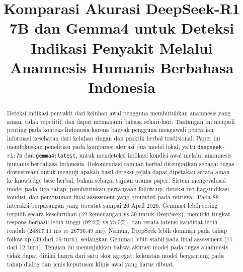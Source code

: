 \documentclass[conference]{IEEEtran}
\begin{document}
\title{Komparasi Akurasi DeepSeek-R1 7B dan Gemma4 untuk Deteksi Indikasi Penyakit Melalui Anamnesis Humanis Berbahasa Indonesia}

\author{
\and
{}
}

\maketitle

\begin{abstract}
Deteksi indikasi penyakit dari keluhan awal pengguna membutuhkan anamnesis yang aman, tidak repetitif, dan dapat memahami bahasa sehari-hari. Tantangan ini menjadi penting pada konteks Indonesia karena banyak pengguna mengawali pencarian informasi kesehatan dari keluhan ringan dan praktik herbal tradisional. Paper ini memfokuskan penelitian pada komparasi akurasi dua model lokal, yaitu \texttt{deepseek-r1:7b} dan \texttt{gemma4:latest}, untuk mendeteksi indikasi kondisi awal melalui anamnesis humanis berbahasa Indonesia. Rekomendasi ramuan herbal ditempatkan sebagai tugas downstream untuk menguji apakah hasil deteksi gejala dapat dipetakan secara aman ke knowledge base herbal, bukan sebagai tujuan utama paper. Sistem mengevaluasi model pada tiga tahap: pembentukan pertanyaan follow-up, deteksi red flag/indikasi kondisi, dan penyusunan final assessment yang grounded pada retrieval. Pada 88 interaksi berpasangan yang tercatat sampai 26 April 2026, Gemma4 lebih sering terpilih secara keseluruhan (42 kemenangan vs 39 untuk DeepSeek), memiliki tingkat respons berhasil lebih tinggi (92,0\% vs 75,0\%), dan rerata latensi kandidat lebih rendah (24817.11 ms vs 26736.49 ms). Namun, DeepSeek lebih dominan pada tahap follow-up (39 dari 76 turn), sedangkan Gemma4 lebih stabil pada final assessment (11 dari 12 turn). Temuan ini menunjukkan bahwa akurasi model pada tugas anamnesis tidak dapat dinilai hanya dari satu skor agregat; kekuatan model bergantung pada tahap dialog dan jenis keputusan klinis awal yang harus dibuat.
\end{abstract}
\end{document}
